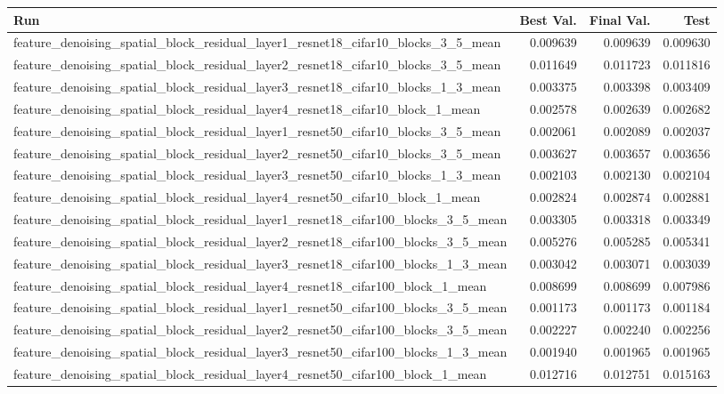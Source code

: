\begin{tabular}{lrrr}
\toprule
Run & Best Val. & Final Val. & Test \\
\midrule
feature\_denoising\_spatial\_block\_residual\_layer1\_resnet18\_cifar10\_blocks\_3\_5\_mean & 0.009639 & 0.009639 & 0.009630 \\
feature\_denoising\_spatial\_block\_residual\_layer2\_resnet18\_cifar10\_blocks\_3\_5\_mean & 0.011649 & 0.011723 & 0.011816 \\
feature\_denoising\_spatial\_block\_residual\_layer3\_resnet18\_cifar10\_blocks\_1\_3\_mean & 0.003375 & 0.003398 & 0.003409 \\
feature\_denoising\_spatial\_block\_residual\_layer4\_resnet18\_cifar10\_block\_1\_mean & 0.002578 & 0.002639 & 0.002682 \\
feature\_denoising\_spatial\_block\_residual\_layer1\_resnet50\_cifar10\_blocks\_3\_5\_mean & 0.002061 & 0.002089 & 0.002037 \\
feature\_denoising\_spatial\_block\_residual\_layer2\_resnet50\_cifar10\_blocks\_3\_5\_mean & 0.003627 & 0.003657 & 0.003656 \\
feature\_denoising\_spatial\_block\_residual\_layer3\_resnet50\_cifar10\_blocks\_1\_3\_mean & 0.002103 & 0.002130 & 0.002104 \\
feature\_denoising\_spatial\_block\_residual\_layer4\_resnet50\_cifar10\_block\_1\_mean & 0.002824 & 0.002874 & 0.002881 \\
feature\_denoising\_spatial\_block\_residual\_layer1\_resnet18\_cifar100\_blocks\_3\_5\_mean & 0.003305 & 0.003318 & 0.003349 \\
feature\_denoising\_spatial\_block\_residual\_layer2\_resnet18\_cifar100\_blocks\_3\_5\_mean & 0.005276 & 0.005285 & 0.005341 \\
feature\_denoising\_spatial\_block\_residual\_layer3\_resnet18\_cifar100\_blocks\_1\_3\_mean & 0.003042 & 0.003071 & 0.003039 \\
feature\_denoising\_spatial\_block\_residual\_layer4\_resnet18\_cifar100\_block\_1\_mean & 0.008699 & 0.008699 & 0.007986 \\
feature\_denoising\_spatial\_block\_residual\_layer1\_resnet50\_cifar100\_blocks\_3\_5\_mean & 0.001173 & 0.001173 & 0.001184 \\
feature\_denoising\_spatial\_block\_residual\_layer2\_resnet50\_cifar100\_blocks\_3\_5\_mean & 0.002227 & 0.002240 & 0.002256 \\
feature\_denoising\_spatial\_block\_residual\_layer3\_resnet50\_cifar100\_blocks\_1\_3\_mean & 0.001940 & 0.001965 & 0.001965 \\
feature\_denoising\_spatial\_block\_residual\_layer4\_resnet50\_cifar100\_block\_1\_mean & 0.012716 & 0.012751 & 0.015163 \\
\bottomrule
\end{tabular}
